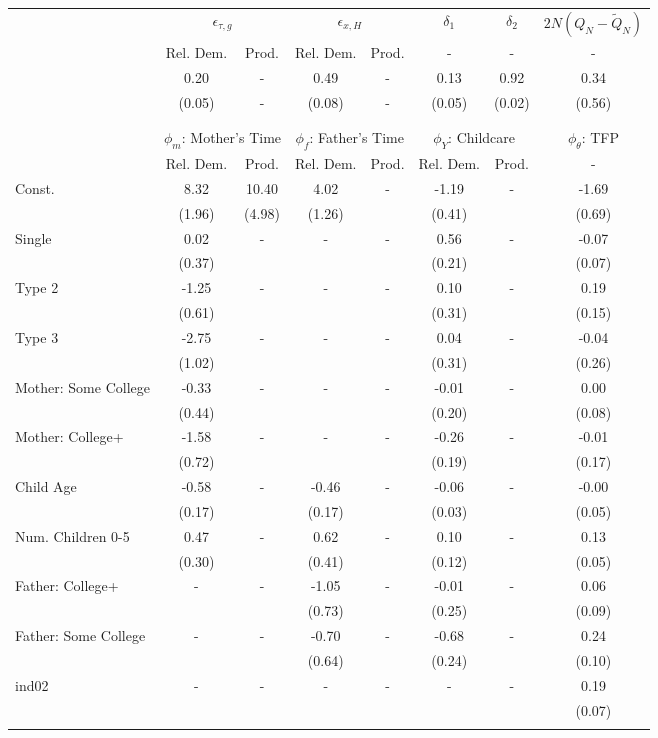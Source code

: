 \begin{tabular}{lccccccc}\toprule
 & \multicolumn{2}{c}{$\epsilon_{\tau,g}$} & \multicolumn{2}{c}{$\epsilon_{x,H}$} & {$\delta_{1}$} & {$\delta_{2}$} & $2N(Q_{N} - \tilde{Q}_{N})$ \\
 & Rel. Dem. & Prod. & Rel. Dem. & Prod. & - & - & - \\\cmidrule(r){2-3}\cmidrule(r){4-5}\cmidrule(r){6-6}\cmidrule(r){7-7}\cmidrule(r){8-8}
&0.20& - &0.49& - &0.13&0.92&0.34\\
&(0.05)& - &(0.08)& - &(0.05)&(0.02)&(0.56)\\
\\
&&&&&&&\\
 & \multicolumn{2}{c}{$\phi_{m}$: Mother's Time} & \multicolumn{2}{c}{$\phi_{f}$: Father's Time} & \multicolumn{2}{c}{$\phi_{Y}$: Childcare} &{$\phi_{\theta}$: TFP} \\
 & Rel. Dem. & Prod. & Rel. Dem. & Prod. & Rel. Dem. & Prod. & -  \\\cmidrule(r){2-3}\cmidrule(r){4-5}\cmidrule(r){6-7}\cmidrule(r){8-8}
Const.&8.32&10.40&4.02& -&-1.19& -&-1.69\\
&(1.96)&(4.98)&(1.26)&&(0.41)&&(0.69)\\
Single&0.02& -& - & -&0.56& -&-0.07\\
&(0.37)& & &&(0.21)&&(0.07)\\
Type 2&-1.25& -& - & -&0.10& -&0.19\\
&(0.61)& & &&(0.31)&&(0.15)\\
Type 3&-2.75& -& - & -&0.04& -&-0.04\\
&(1.02)& & &&(0.31)&&(0.26)\\
Mother: Some College&-0.33& -& - & -&-0.01& -&0.00\\
&(0.44)& & &&(0.20)&&(0.08)\\
Mother: College+&-1.58& -& - & -&-0.26& -&-0.01\\
&(0.72)& & &&(0.19)&&(0.17)\\
Child Age&-0.58& -&-0.46& -&-0.06& -&-0.00\\
&(0.17)&&(0.17)&&(0.03)&&(0.05)\\
Num. Children 0-5&0.47& -&0.62& -&0.10& -&0.13\\
&(0.30)&&(0.41)&&(0.12)&&(0.05)\\
Father: College+& - & -&-1.05& -&-0.01& -&0.06\\
 & &&(0.73)&&(0.25)&&(0.09)\\
Father: Some College& - & -&-0.70& -&-0.68& -&0.24\\
 & &&(0.64)&&(0.24)&&(0.10)\\
ind02& - & -& - & -& - & -&0.19\\
 & & & & & &&(0.07)\\
\\
\bottomrule\end{tabular}